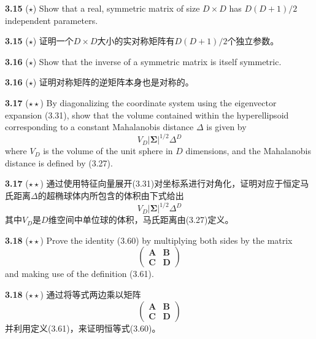 \documentclass{article}
\begin{document}
\textbf{3.15} ($\star$) Show that a real, symmetric matrix of size $D \times D$ has $D(D+1)/2$ independent parameters.

\textbf{3.15} ($\star$) 证明一个$D \times D$大小的实对称矩阵有$D(D+1)/2$个独立参数。

\textbf{3.16} ($\star$) Show that the inverse of a symmetric matrix is itself symmetric.

\textbf{3.16} ($\star$) 证明对称矩阵的逆矩阵本身也是对称的。

\textbf{3.17} ($\star\star$) By diagonalizing the coordinate system using the eigenvector expansion (3.31), show that the volume contained within the hyperellipsoid corresponding to a constant Mahalanobis distance $\Delta$ is given by
\begin{equation}
V_D |\boldsymbol{\Sigma}|^{1/2} \Delta^D \tag{3.207}
\end{equation}
where $V_D$ is the volume of the unit sphere in $D$ dimensions, and the Mahalanobis distance is defined by (3.27).

\textbf{3.17} ($\star\star$) 通过使用特征向量展开(3.31)对坐标系进行对角化，证明对应于恒定马氏距离$\Delta$的超椭球体内所包含的体积由下式给出
\begin{equation}
V_D |\boldsymbol{\Sigma}|^{1/2} \Delta^D \tag{3.207}
\end{equation}
其中$V_D$是$D$维空间中单位球的体积，马氏距离由(3.27)定义。

\textbf{3.18} ($\star\star$) Prove the identity (3.60) by multiplying both sides by the matrix
\begin{equation}
\begin{pmatrix} \mathbf{A} & \mathbf{B} \\ \mathbf{C} & \mathbf{D} \end{pmatrix} \tag{3.208}
\end{equation}
and making use of the definition (3.61).

\textbf{3.18} ($\star\star$) 通过将等式两边乘以矩阵
\begin{equation}
\begin{pmatrix} \mathbf{A} & \mathbf{B} \\ \mathbf{C} & \mathbf{D} \end{pmatrix} \tag{3.208}
\end{equation}
并利用定义(3.61)，来证明恒等式(3.60)。
\end{document}
